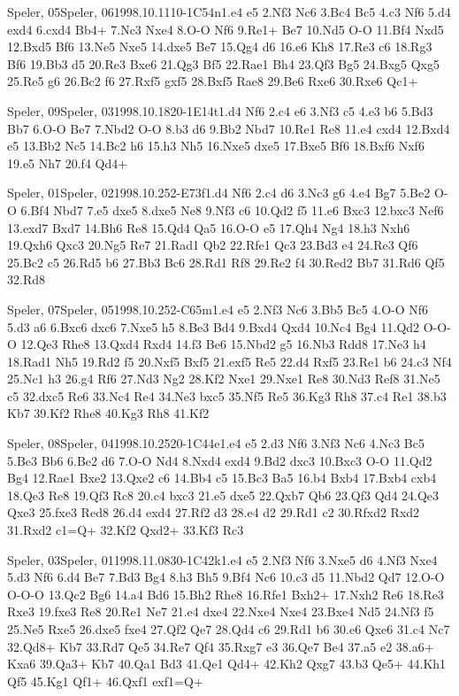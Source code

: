 \documentclass[twocolumn,a4paper,10pt]{report}
\begin{document}
\begin{chessgame}{Speler, 05}{Speler, 06}{1998.10.11}{1}{0-1}{C54n}{1.e4 e5 2.Nf3 Nc6 3.Bc4 Bc5 4.c3 Nf6 5.d4 exd4 6.cxd4 Bb4+ 7.Nc3 Nxe4 8.O-O Nf6 9.Re1+ Be7 10.Nd5 O-O 11.Bf4 Nxd5 12.Bxd5 Bf6 13.Ne5 Nxe5 14.dxe5 Be7 15.Qg4 d6 16.e6 Kh8 17.Re3 c6 18.Rg3 Bf6 19.Bb3 d5 20.Re3 Bxe6 21.Qg3 Bf5 22.Rae1 Bh4 23.Qf3 Bg5 24.Bxg5 Qxg5 25.Re5 g6 26.Bc2 f6 27.Rxf5 gxf5 28.Bxf5 Rae8 29.Be6 Rxe6 30.Rxe6 Qc1+}\end{chessgame}
\begin{chessgame}{Speler, 09}{Speler, 03}{1998.10.18}{2}{0-1}{E14t}{1.d4 Nf6 2.c4 e6 3.Nf3 c5 4.e3 b6 5.Bd3 Bb7 6.O-O Be7 7.Nbd2 O-O 8.b3 d6 9.Bb2 Nbd7 10.Re1 Re8 11.e4 cxd4 12.Bxd4 e5 13.Bb2 Nc5 14.Bc2 h6 15.h3 Nh5 16.Nxe5 dxe5 17.Bxe5 Bf6 18.Bxf6 Nxf6 19.e5 Nh7 20.f4 Qd4+}\end{chessgame}
\begin{chessgame}{Speler, 01}{Speler, 02}{1998.10.25}{2}{\textonehalf-\textonehalf}{E73f}{1.d4 Nf6 2.c4 d6 3.Nc3 g6 4.e4 Bg7 5.Be2 O-O 6.Bf4 Nbd7 7.e5 dxe5 8.dxe5 Ne8 9.Nf3 c6 10.Qd2 f5 11.e6 Bxc3 12.bxc3 Nef6 13.exd7 Bxd7 14.Bh6 Re8 15.Qd4 Qa5 16.O-O e5 17.Qh4 Ng4 18.h3 Nxh6 19.Qxh6 Qxc3 20.Ng5 Re7 21.Rad1 Qb2 22.Rfe1 Qc3 23.Bd3 e4 24.Re3 Qf6 25.Bc2 c5 26.Rd5 b6 27.Bb3 Bc6 28.Rd1 Rf8 29.Re2 f4 30.Red2 Bb7 31.Rd6 Qf5 32.Rd8}\end{chessgame}
\begin{chessgame}{Speler, 07}{Speler, 05}{1998.10.25}{2}{\textonehalf-\textonehalf}{C65m}{1.e4 e5 2.Nf3 Nc6 3.Bb5 Bc5 4.O-O Nf6 5.d3 a6 6.Bxc6 dxc6 7.Nxe5 h5 8.Be3 Bd4 9.Bxd4 Qxd4 10.Nc4 Bg4 11.Qd2 O-O-O 12.Qe3 Rhe8 13.Qxd4 Rxd4 14.f3 Be6 15.Nbd2 g5 16.Nb3 Rdd8 17.Ne3 h4 18.Rad1 Nh5 19.Rd2 f5 20.Nxf5 Bxf5 21.exf5 Re5 22.d4 Rxf5 23.Re1 b6 24.c3 Nf4 25.Nc1 h3 26.g4 Rf6 27.Nd3 Ng2 28.Kf2 Nxe1 29.Nxe1 Re8 30.Nd3 Ref8 31.Ne5 c5 32.dxc5 Re6 33.Nc4 Re4 34.Ne3 bxc5 35.Nf5 Re5 36.Kg3 Rh8 37.c4 Re1 38.b3 Kb7 39.Kf2 Rhe8 40.Kg3 Rh8 41.Kf2}\end{chessgame}
\begin{chessgame}{Speler, 08}{Speler, 04}{1998.10.25}{2}{0-1}{C44e}{1.e4 e5 2.d3 Nf6 3.Nf3 Nc6 4.Nc3 Bc5 5.Be3 Bb6 6.Be2 d6 7.O-O Nd4 8.Nxd4 exd4 9.Bd2 dxc3 10.Bxc3 O-O 11.Qd2 Bg4 12.Rae1 Bxe2 13.Qxe2 c6 14.Bb4 c5 15.Bc3 Ba5 16.b4 Bxb4 17.Bxb4 cxb4 18.Qe3 Re8 19.Qf3 Rc8 20.c4 bxc3 21.e5 dxe5 22.Qxb7 Qb6 23.Qf3 Qd4 24.Qe3 Qxe3 25.fxe3 Red8 26.d4 exd4 27.Rf2 d3 28.e4 d2 29.Rd1 c2 30.Rfxd2 Rxd2 31.Rxd2 c1=Q+ 32.Kf2 Qxd2+ 33.Kf3 Rc3\mate}\end{chessgame}
\begin{chessgame}{Speler, 03}{Speler, 01}{1998.11.08}{3}{0-1}{C42k}{1.e4 e5 2.Nf3 Nf6 3.Nxe5 d6 4.Nf3 Nxe4 5.d3 Nf6 6.d4 Be7 7.Bd3 Bg4 8.h3 Bh5 9.Bf4 Nc6 10.c3 d5 11.Nbd2 Qd7 12.O-O O-O-O 13.Qc2 Bg6 14.a4 Bd6 15.Bh2 Rhe8 16.Rfe1 Bxh2+ 17.Nxh2 Re6 18.Re3 Rxe3 19.fxe3 Re8 20.Re1 Ne7 21.e4 dxe4 22.Nxe4 Nxe4 23.Bxe4 Nd5 24.Nf3 f5 25.Ne5 Rxe5 26.dxe5 fxe4 27.Qf2 Qe7 28.Qd4 c6 29.Rd1 b6 30.e6 Qxe6 31.c4 Nc7 32.Qd8+ Kb7 33.Rd7 Qe5 34.Re7 Qf4 35.Rxg7 e3 36.Qe7 Be4 37.a5 e2 38.a6+ Kxa6 39.Qa3+ Kb7 40.Qa1 Bd3 41.Qe1 Qd4+ 42.Kh2 Qxg7 43.b3 Qe5+ 44.Kh1 Qf5 45.Kg1 Qf1+ 46.Qxf1 exf1=Q+}\end{chessgame}
\end{document}
